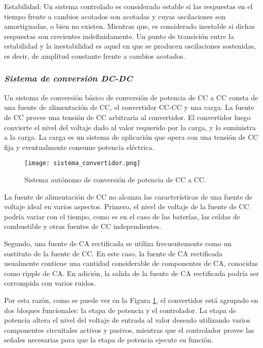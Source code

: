 Estabilidad: Un sistema controlado es considerado estable si las respuestas en el tiempo frente a cambios acotados son acotadas y cuyas oscilaciones son amortiguadas, 
o bien no existen. Mientras que, es considerado inestable si dichas respuestas son crecientes indefinidamente. Un punto de transición entre la estabilidad y la 
inestabilidad es aquel en que se producen oscilaciones sostenidas, es decir, de amplitud constante frente a cambios acotados. \parencite{ADAM}


\subsubsection*{\it{Sistema de conversión DC-DC}}
\vspace{-0.25cm}
Un sistema de conversión básico de conversión de potencia de CC a CC consta de una fuente de alimentación de CC, el convertidor CC-CC y una carga.
La fuente de CC provee una tensión de CC arbitraria al convertidor. El convertidor luego convierte el nivel del voltaje dado al valor requerido
por la carga, y lo suministra a la carga. La carga es un sistema de aplicación que opera con una tensión de CC fija y eventualmente consume potencia
eléctrica.

\begin{figure}[H]
    \centering
    \texttt{[image: sistema\_convertidor.png]}
    \vspace{-0.25cm}
    \caption{Sistema autónomo de conversión de potencia de CC a CC.}
    \label{fig:sistema_convertidor}
\end{figure}
\vspace{-0.5cm}

La fuente de alimentación de CC no alcanza las características de una fuente de voltaje ideal en varios aspectos.
Primero, el nivel de voltaje de la fuente de CC podría variar con el tiempo, como es en el caso de las baterías, las celdas de combustible y otras
fuentes de CC independientes.

Segundo, una fuente de CA rectificada se utiliza frecuentemente como un sustituto de la fuente de CC. En este caso, la fuente de CA rectificada
usualmente contiene una cantidad considerable de componentes de CA, conocidas como ripple de CA. En adición, la salida de la fuente de CA rectificada
podría ser corrompida con varios ruidos.

Por esta razón, como se puede ver en la Figura \ref{fig:sistema_convertidor}, el convertidor está agrupado en dos bloques funcionales: la etapa de potencia
y el controlador. La etapa de potencia altera el nivel del voltaje de entrada al valor deseado utilizando varios componentes circuitales activos y pasivos,
mientras que el controlador provee las señales necesarias para que la etapa de potencia ejecute su función.

